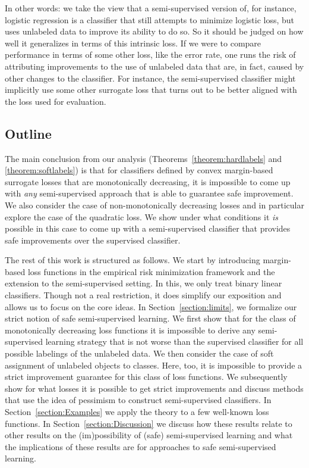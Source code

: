 \documentclass[twoside]{memoir}\usepackage[]{graphicx}\usepackage{xcolor}
\begin{document}
In other words: we take the view that a semi-supervised version of, for instance, logistic regression is a classifier that still attempts to minimize logistic loss, but uses unlabeled data to improve its ability to do so. So it should be judged on how well it generalizes in terms of this intrinsic loss. If we were to compare performance in terms of some other loss, like the error rate, one runs the risk of attributing improvements to the use of unlabeled data that are, in fact, caused by other changes to the classifier. For instance, the semi-supervised classifier might implicitly use some other surrogate loss that turns out to be better aligned with the loss used for evaluation.

\subsection{Outline}
The main conclusion from our analysis (Theorems~\ref{theorem:hardlabels} and \ref{theorem:softlabels}) is that for classifiers defined by convex margin-based surrogate losses that are monotonically decreasing, it is impossible to come up with \emph{any} semi-supervised approach that is able to guarantee safe improvement. We also consider the case of non-monotonically decreasing losses and in particular explore the case of the quadratic loss.  We show under what conditions it \emph{is} possible in this case to come up with a semi-supervised classifier that provides safe improvements over the supervised classifier.

The rest of this work is structured as follows. We start by introducing margin-based loss functions in the empirical risk minimization framework and the extension to the semi-supervised setting.  In this, we only treat binary linear classifiers. Though not a real restriction, it does simplify our exposition and allows us to focus on the core ideas.  In Section~\ref{section:limits}, we formalize our strict notion of safe semi-supervised learning. We first show that for the class of monotonically decreasing loss functions it is impossible to derive any semi-supervised learning strategy that is not worse than the supervised classifier for all possible labelings of the unlabeled data. We then consider the case of soft assignment of unlabeled objects to classes. Here, too, it is impossible to provide a strict improvement guarantee for this class of loss functions.  We subsequently show for what losses it is possible to get strict improvements and discuss methods that use the idea of pessimism to construct semi-supervised classifiers. In Section~\ref{section:Examples} we apply the theory to a few well-known loss functions. In Section~\ref{section:Discussion} we discuss how these results relate to other results on the (im)possibility of (safe) semi-supervised learning and what the implications of these results are for approaches to safe semi-supervised learning.
\end{document}
